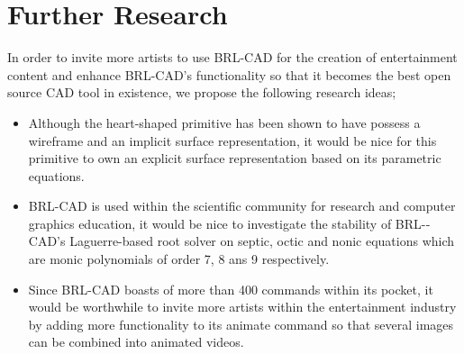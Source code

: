 
\section{Further Research}

\hspace{30} In   order   to   invite   more   artists   to   use   BRL-­CAD   for   the   creation   of  
entertainment   content   and   enhance   BRL-­CAD's   functionality   so   that   it   becomes  
the   best   open   source   CAD   tool   in   existence,   we   propose  the following research ideas;

\begin{itemize}
\item Although   the   heart-­shaped   primitive   has   been   shown   to   have   possess   a  
wireframe   and   an   implicit   surface   representation,   it   would   be   nice   for   this  
primitive   to   own   an   explicit   surface   representation   based   on   its   parametric  
equations.  
\item BRL­-CAD   is   used   within   the   scientific   community   for   research   and  
computer   graphics   education,   it   would   be   nice   to   investigate   the   stability  
of   BRL-­CAD's   Laguerre­-based   root   solver   on   septic,   octic   and   nonic  
equations which are monic polynomials of order 7, 8 ans 9 respectively.  
\item Since   BRL-­CAD   boasts   of   more   than   400   commands   within   its   pocket,   it  
would   be   worthwhile   to   invite   more   artists   within   the   entertainment   industry  
by   adding   more   functionality   to   its   animate   command   so   that   several  
images can be combined into animated videos.
\end{itemize}

\clearpage

